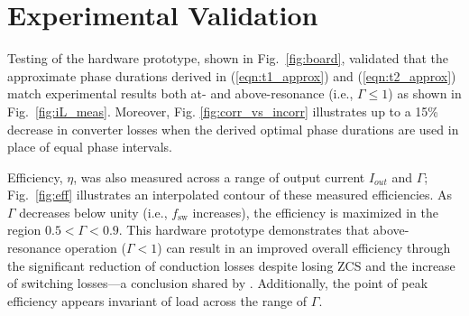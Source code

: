 \section{Experimental Validation}
\vspace{-0.75em}

    
    
    

Testing of the hardware prototype, shown in Fig.~\ref{fig:board}, validated that the approximate phase durations derived in (\ref{eqn:t1_approx}) and (\ref{eqn:t2_approx}) match experimental results both at- and above-resonance (i.e., $\Gamma \leq 1$) as shown in Fig.~\ref{fig:iL_meas}.
Moreover, Fig. \ref{fig:corr_vs_incorr} illustrates up to a 15\% decrease in converter losses when the derived optimal phase durations are used in place of equal phase intervals.


Efficiency, $\eta$, was also measured across a range of output current $I_{out}$ and $\Gamma$; Fig.~\ref{fig:eff} illustrates an interpolated contour of these measured efficiencies.
As $\Gamma$ decreases below unity (i.e., $f_{\textrm{sw}}$ increases), the efficiency is maximized in the region $0.5<\Gamma<0.9$. 
This hardware prototype demonstrates that above-resonance operation ($\Gamma<1$) can result in an improved overall efficiency through the significant reduction of conduction losses despite losing ZCS and the increase of switching losses---a conclusion shared by \cite{Rentmeister_COMPEL2018}.
Additionally, the point of peak efficiency appears invariant of load across the range of $\Gamma$.


